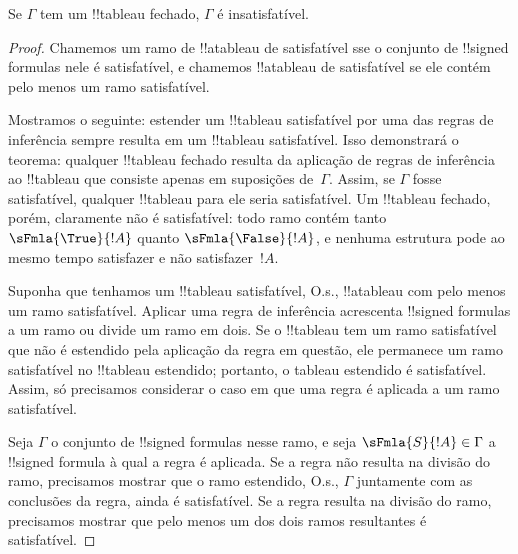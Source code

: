 \documentclass[../../../include/open-logic-section]{subfiles}
\begin{document}
\begin{thm}[Correção]
  Se $\Gamma$ tem um !!{tableau} fechado, $\Gamma$ é insatisfatível.
\end{thm}

\begin{proof}
Chamemos um ramo de !!a{tableau} de satisfatível sse o conjunto de
!!{signed formula}s nele é satisfatível, e chamemos !!a{tableau} de
satisfatível se ele contém pelo menos um ramo satisfatível.

Mostramos o seguinte: estender um !!{tableau} satisfatível por uma das
regras de inferência sempre resulta em um !!{tableau} satisfatível.
Isso demonstrará o teorema: qualquer !!{tableau} fechado resulta da
aplicação de regras de inferência ao !!{tableau} que consiste apenas em
suposições de~$\Gamma$. Assim, se $\Gamma$ fosse satisfatível, qualquer
!!{tableau} para ele seria satisfatível. Um !!{tableau} fechado,
porém, claramente não é satisfatível: todo ramo contém tanto
$\sFmla{\True}{!A}$ quanto $\sFmla{\False}{!A}$, e nenhuma estrutura pode
ao mesmo tempo satisfazer e não satisfazer~$!A$.

Suponha que tenhamos um !!{tableau} satisfatível, O.s.\@, !!a{tableau} com pelo
menos um ramo satisfatível. Aplicar uma regra de inferência acrescenta
!!{signed formula}s a um ramo ou divide um ramo em dois. Se o
!!{tableau} tem um ramo satisfatível que não é estendido pela aplicação
da regra em questão, ele permanece um ramo satisfatível no
!!{tableau} estendido; portanto, o tableau estendido é satisfatível. Assim,
só precisamos considerar o caso em que uma regra é aplicada a um
ramo satisfatível.

Seja $\Gamma$ o conjunto de !!{signed formula}s nesse ramo, e
seja $\sFmla{S}{!A} \in \Gamma$ a !!{signed formula} à qual a
regra é aplicada. Se a regra não resulta na divisão do ramo, precisamos
mostrar que o ramo estendido, O.s.\@, $\Gamma$ juntamente com
as conclusões da regra, ainda é satisfatível. Se a regra resulta
na divisão do ramo, precisamos mostrar que pelo menos um dos dois
ramos resultantes é satisfatível.
  

\end{proof}
\end{document}
